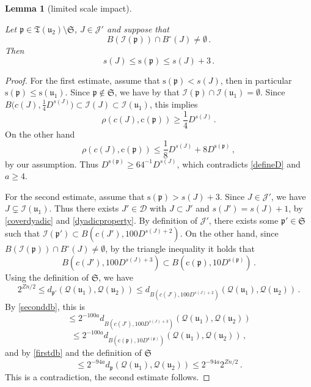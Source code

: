 \documentclass[10pt,a4paper]{article}
\theoremstyle{plain}
\newtheorem{lemma}[theorem]{Lemma}
\theoremstyle{definition}
\numberwithin{equation}{subsection}
\newcommand{\fp}{{\mathfrak p}}
\newcommand{\fu}{{\mathfrak u}}
\newcommand{\fT}{{\mathfrak T}}
\newcommand{\pc}{{\mathrm{c}}}
\newcommand{\ps}{{\mathrm{s}}}
\newcommand{\scI}{{\mathcal{I}}} %
\newcommand{\fcc}{{\mathcal{Q}}}
\newcommand{\lean}[1]{}
\newcommand{\uses}[1]{}
\newcommand{\leanok}{}
\begin{document}
    \begin{lemma}[limited scale impact]
        \label{limited-scale-impact}
        \leanok
        \lean{TileStructure.Forest.limited_scale_impact}
        \uses{overlap-implies-distance}
        Let $\fp \in \fT(\fu_2) \setminus \mathfrak{S}$, $J \in \mathcal{J}'$ and suppose that
        $$
           B(\scI(\fp)) \cap B^\circ(J) \ne \emptyset\,.
        $$
        Then
        $$
            s(J) \le \ps(\fp) \le s(J) +3\,.
        $$
    \end{lemma}

    \begin{proof}
        \leanok
        For the first estimate, assume that $\ps(\fp) < s(J)$, then in particular $\ps(\fp) \le \ps(\fu_1)$. Since $\fp \notin \mathfrak{S}$, we have by  that $\scI(\fp) \cap \scI(\fu_1) = \emptyset$.
        Since $B\Big(c(J), \frac{1}{4} D^{s(J)}\Big) \subset \scI(J) \subset \scI(\fu_1)$, this implies
        $$
            \rho(c(J), \pc(\fp)) \ge \frac{1}{4}D^{s(J)}\,.
        $$
        On the other hand
        $$
            \rho(c(J), \pc(\fp)) \le \frac{1}{8} D^{s(J)} + 8 D^{\ps(\fp)}\,,
        $$
        by our assumption. Thus $D^{\ps(\fp)} \ge 64^{-1} D^{s(J)}$, which contradicts \eqref{defineD} and $a \ge 4$.

        For the second estimate, assume that $\ps(\fp) > s(J) + 3$. Since $J \in \mathcal{J}'$, we have $J \subsetneq \scI(\fu_1)$. Thus there exists $J' \in \mathcal{D}$ with $J \subset J'$ and $s(J') = s(J) + 1$, by \eqref{coverdyadic} and \eqref{dyadicproperty}. By definition of $\mathcal{J}'$, there exists some $\fp' \in \mathfrak{S}$ such that $\scI(\fp') \subset B(c(J'), 100 D^{s(J) + 2})$. On the other hand, since $B(\scI(\fp)) \cap B^\circ(J) \ne \emptyset$, by the triangle inequality it holds that
        $$
            B(c(J'), 100 D^{s(J) + 3}) \subset B(\pc(\fp), 10 D^{\ps(\fp)})\,.
        $$
        Using the definition of $\mathfrak{S}$, we have
        $$
            2^{Zn/2} \le d_{\fp'}(\fcc(\fu_1), \fcc(\fu_2)) \le d_{B(c(J'), 100 D^{s(J) + 2})}(\fcc(\fu_1), \fcc(\fu_2))\,.
        $$
        By \eqref{seconddb}, this is
        $$
            \le 2^{-100a} d_{B(c(J'), 100 D^{s(J) + 3})}(\fcc(\fu_1), \fcc(\fu_2))
        $$
        $$
            \le 2^{-100a} d_{B(\pc(\fp), 10 D^{\ps(\fp)})}(\fcc(\fu_1), \fcc(\fu_2))\,,
        $$
        and by \eqref{firstdb} and the definition of $\mathfrak{S}$
        $$
            \le 2^{-94a} d_{\fp}(\fcc(\fu_1), \fcc(\fu_2)) \le 2^{-94a} 2^{Zn/2}\,.
        $$
        This is a contradiction, the second estimate follows.
    \end{proof}
\end{document}
